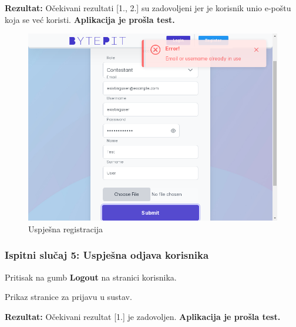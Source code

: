			\noindent \textbf{Rezultat:} Očekivani rezultati [1., 2.] su zadovoljeni jer je korisnik unio e-poštu koja se već koristi. \textbf{Aplikacija je prošla test.}
			
			\begin{figure}[H]
				\includegraphics[scale=0.50]{slike/registration_already_exists_test_result.PNG}
				\centering
				\caption{Uspješna registracija}
				\label{fig:failed_register}
			\end{figure}
			
			\eject
			
			\subsubsection{Ispitni slučaj 5: Uspješna odjava korisnika}
			
			
			\begin{packed_enum}
				
				\item  Pritisak na gumb \textbf{Logout} na stranici korisnika.
				
			\end{packed_enum}
			
			\begin{packed_enum}
				
				\item  Prikaz stranice za prijavu u sustav.
				
			\end{packed_enum}
			
			\noindent \textbf{Rezultat:} Očekivani rezultat [1.] je zadovoljen. \textbf{Aplikacija je prošla test.}
			
